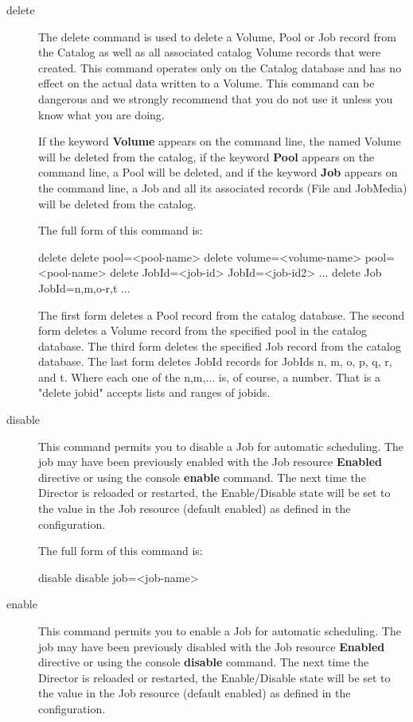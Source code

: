 \begin{description}
\item [delete]
   The delete command is used to delete a Volume, Pool or Job record from
   the Catalog as well as all associated catalog Volume records that were
   created.  This command operates only on the Catalog database and has no
   effect on the actual data written to a Volume.  This command can be
   dangerous and we strongly recommend that you do not use it unless you
   know what you are doing.

   If the keyword {\bf Volume} appears on the command line, the named
   Volume will be deleted from the catalog, if the keyword {\bf Pool}
   appears on the command line, a Pool will be deleted, and if the keyword
   {\bf Job} appears on the command line, a Job and all its associated
   records (File and JobMedia) will be deleted from the catalog.

   The full form of this command is:

\begin{bconsole}{delete}
delete pool=<pool-name>
delete volume=<volume-name> pool=<pool-name>
delete JobId=<job-id> JobId=<job-id2> ...
delete Job JobId=n,m,o-r,t ...
\end{bconsole}

   The first form deletes a Pool record from the catalog database.  The
   second form deletes a Volume record from the specified pool in the
   catalog database.  The third form deletes the specified Job record from
   the catalog database.  The last form deletes JobId records for JobIds
   n, m, o, p, q, r, and t.  Where each one of the n,m,...  is, of course, a
   number. That is a "delete jobid" accepts lists and ranges of
   jobids.

\item [disable]
  This command permits you to disable a Job for automatic scheduling.
  The job may have been previously enabled with the Job resource
  {\bf Enabled} directive or using the console {\bf enable} command.
  The next time the Director is reloaded or restarted,
  the Enable/Disable state will be set to the value in the Job resource
  (default enabled) as defined in the \bareosDir configuration.

   The full form of this command is:
\begin{bconsole}{disable}
disable job=<job-name>
\end{bconsole}

\item [enable]
  This command permits you to enable a Job for automatic scheduling.
  The job may have been previously disabled with the Job resource
  {\bf Enabled} directive or using the console {\bf disable} command.
  The next time the Director is reloaded or restarted,
  the Enable/Disable state will be set to the value in the Job resource
  (default enabled) as defined in the \bareosDir configuration.


\end{description}
